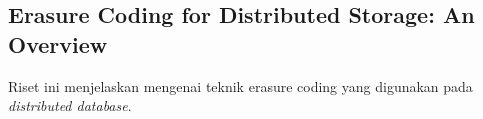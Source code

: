 \subsection{Erasure Coding for Distributed Storage: An Overview}

Riset ini menjelaskan mengenai teknik erasure coding yang digunakan pada \textit{distributed database}.